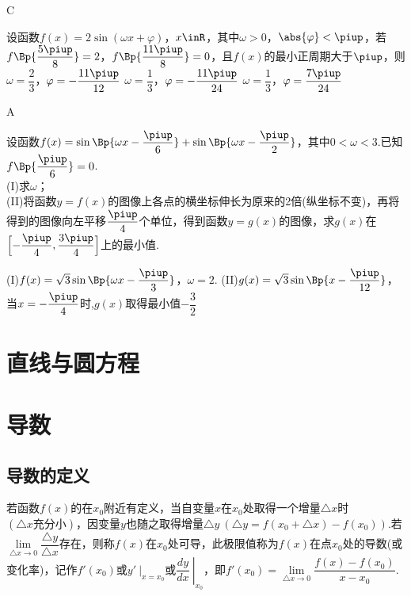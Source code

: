 \begin{exercise}
        \begin{answer}
          C
        \end{answer}
      \vspace{1.5em}
      \item%
            设函数$f(x)=2\sin(\omega x+\varphi)$，$x\inR$，其中$\omega>0$，$\abs{\varphi}<\piup$，若$f\Bp{\dfrac{5\piup}8}=2$，$f\Bp{\dfrac{11\piup}8}=0$，且$f(x)$的最小正周期大于$\piup$，则\xz
             {$\omega=\dfrac23$，$\varphi=-\dfrac{11\piup}{12}$}
             {$\omega=\dfrac13$，$\varphi=-\dfrac{11\piup}{24}$}
             {$\omega=\dfrac13$，$\varphi=\dfrac{7\piup}{24}$}
            \begin{answer}
              A
            \end{answer}
      \vspace{1.5em}
      \item%
            设函数$f(x)=\sin\Bp{\omega x-\dfrac{\piup}6}+\sin\Bp{\omega x-\dfrac{\piup}2}$，其中$0<\omega<3$.已知$f\Bp{\dfrac{\piup}6}=0$.\\
            (I)求$\omega$；\\
            (II)将函数$y=f(x)$的图像上各点的横坐标伸长为原来的2倍(纵坐标不变)，再将得到的图像向左平移$\dfrac{\piup}4$个单位，得到函数$y=g(x)$的图像，求$g(x)$在$\Bigl[-\dfrac{\piup}4,\dfrac{3\piup}4\Bigr]$上的最小值.
            \begin{answer}
              (I)$f(x)=\sqrt3\sin\Bp{\omega x-\dfrac{\piup}3}$，$\omega=2$.
              (II)$g(x)=\sqrt3\sin\Bp{x-\dfrac{\piup}{12}}$，当$x=-\dfrac{\piup}4$时,$g(x)$取得最小值$-\dfrac32$
            \end{answer}
      \vspace{5cm}
    \end{exercise}
\section{直线与圆方程}
\section{导数}
  \subsection{导数的定义}
    {\kaishu 若函数$f(x)$的在$x_0$附近有定义，当自变量$x$在$x_0$处取得一个增量$ \triangle x $时$ (\triangle x\text{充分小}) $，因变量$ y $也随之取得增量$ \triangle y~\left(\triangle y=f(x_0+\triangle x)-f(x_0)\right). $若$ \lim\limits_{\triangle x \to 0}\dfrac{\triangle y}{\triangle x} $存在，则称$f(x)$在$x_0$处可导，此极限值称为$ f(x) $在点$x_0$处的导数(或变化率)，记作$ f'(x_0) $或$ \left.y'~\right|_{x=x_0} $或$\left.\dfrac{ dy}{dx }~\right|_{x_0}$，即$ f'(x_0)= \lim\limits_{\triangle x \to 0}\dfrac{f(x)-f(x_0)}{x-x_0}$.}
